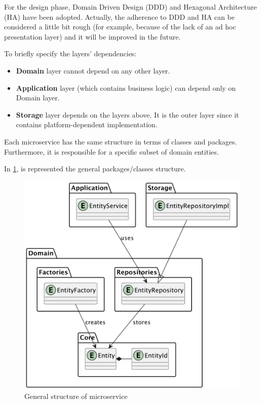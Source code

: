 \documentclass{scrartcl}
\begin{document}
    For the design phase, Domain Driven Design (DDD) and Hexagonal Architecture (HA) have been adopted.
    Actually, the adherence to DDD and HA can be considered a little bit rough (for example, because of the lack of an ad hoc presentation layer) and it will be improved in the future.

    To briefly specify the layers' dependencies:
    \begin{itemize}
        \item \textbf{Domain} layer cannot depend on any other layer.
        \item \textbf{Application} layer (which contains business logic) can depend only on Domain layer.
        \item \textbf{Storage} layer depends on the layers above.
        It is the outer layer since it contains platform-dependent implementation.
    \end{itemize}

    Each microservice has the same structure in terms of classes and packages.
    Furthermore, it is responsible for a specific subset of domain entities.

    In \cref{fig:general-structure}, is represented the general packages/classes structure.

    \begin{figure}
        \centering
        \includegraphics[scale=0.55]{img/general-structure}
        \caption{General structure of microservice}
        \label{fig:general-structure}
    \end{figure}
\end{document}
